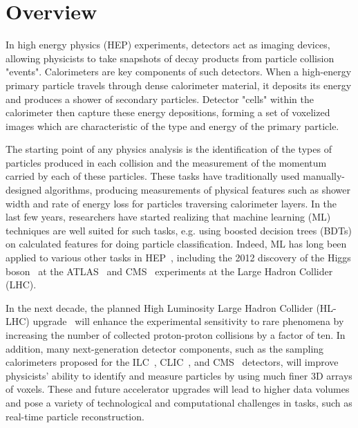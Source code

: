 \section{Overview}

In high energy physics (HEP) experiments, detectors act as imaging devices, allowing physicists to take snapshots of decay products from particle collision "events". Calorimeters are key components of such detectors. When a high-energy primary particle travels through dense calorimeter material, it deposits its energy and produces a shower of secondary particles. Detector "cells" within the calorimeter then capture these energy depositions, forming a set of voxelized images which are characteristic of the type and energy of the primary particle. %

The starting point of any physics analysis is the identification of the types of particles produced in each collision and the measurement of the momentum carried by each of these particles. These tasks have traditionally used manually-designed algorithms, producing measurements of physical features such as shower width and rate of energy loss for particles traversing calorimeter layers.
In the last few years, researchers have started realizing that machine learning (ML) techniques are well suited for such tasks, 
e.g. using boosted decision trees (BDTs) on calculated features for doing particle classification. Indeed, ML has long been applied to various other tasks in HEP~\cite{Denby:1987rk,Peterson:1988gs,Abreu:1992jp}, including the 2012 discovery of the Higgs boson~\cite{HiggsATLAS,HiggsCMS} at the ATLAS~\cite{Aad:2008zzm} and CMS~\cite{Chatrchyan:2008aa} experiments at the Large Hadron Collider (LHC). 

In the next decade, the planned High Luminosity Large Hadron Collider (HL-LHC) upgrade~\cite{Apollinari:2284929} will enhance
the experimental sensitivity to rare phenomena by increasing the number of collected proton-proton collisions by a factor of ten. In addition, many next-generation detector components, such as the sampling calorimeters proposed for the ILC~\cite{ILC}, CLIC~\cite{CLIC}, and CMS~\cite{CMSCollaboration:2015zni} detectors, will improve physicists' ability to identify and measure particles by using much finer 3D arrays of voxels. These and future accelerator upgrades will lead to higher data volumes and pose a variety of technological and computational challenges in tasks, such as real-time particle reconstruction.

